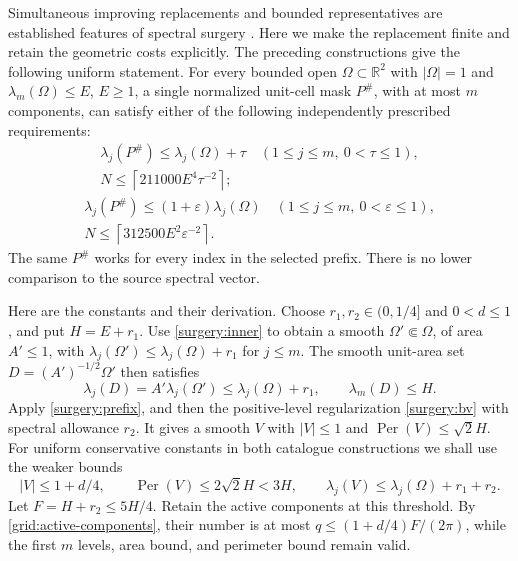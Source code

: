 \documentclass[11pt,reqno]{amsart}
\numberwithin{equation}{section}
\newcommand{\R}{\mathbb R}
\newcommand{\abs}[1]{\lvert#1\rvert}
\newcommand{\Om}{\Omega}
\begin{document}
Simultaneous improving replacements and bounded representatives
are established features of spectral surgery
\cite{MazzoleniPratelli2013,BucurMazzoleni2015}.  Here we make the
replacement finite and retain the geometric costs explicitly.
The preceding constructions give the following uniform statement.
For every bounded open \(\Om\subset\R^2\) with
\(\abs\Om=1\) and \(\lambda_m(\Om)\le E\), \(E\ge1\), a single
normalized unit-cell mask \(P^\#\), with at most \(m\) components,
can satisfy either of the following independently prescribed
requirements:
\begin{equation}
 \begin{gathered}
  \lambda_j(P^\#)\le\lambda_j(\Om)+\tau
       \quad(1\le j\le m,\ 0<\tau\le1),\\
  N\le\left\lceil211000E^4\tau^{-2}\right\rceil;
 \end{gathered}
 \label{grid:additive}
\end{equation}
\begin{equation}
 \begin{gathered}
  \lambda_j(P^\#)\le(1+\varepsilon)\lambda_j(\Om)
       \quad(1\le j\le m,\ 0<\varepsilon\le1),\\
  N\le\left\lceil312500E^2\varepsilon^{-2}\right\rceil.
 \end{gathered}
 \label{grid:relative}
\end{equation}
The same \(P^\#\) works for every index in the selected prefix.
There is no lower comparison to the source spectral vector.

Here are the constants and their derivation.  Choose
\(r_1,r_2\in(0,1/4]\) and \(0<d\le1\), and put \(H=E+r_1\).
Use \eqref{surgery:inner} to obtain a smooth
\(\Om'\Subset\Om\), of area \(A'\le1\), with
\(\lambda_j(\Om')\le\lambda_j(\Om)+r_1\) for \(j\le m\).
The smooth unit-area set \(D=(A')^{-1/2}\Om'\) then satisfies
\[
 \lambda_j(D)=A'\lambda_j(\Om')
 \le\lambda_j(\Om)+r_1,\qquad \lambda_m(D)\le H.
\]
Apply \eqref{surgery:prefix}, and then the positive-level
regularization \eqref{surgery:bv} with spectral allowance \(r_2\).
It gives a smooth \(V\) with \(\abs V\le1\) and
\(\operatorname{Per}(V)\le\sqrt2H\).  For uniform conservative
constants in both catalogue constructions we shall use the weaker
bounds
\[
 \abs V\le1+d/4,\qquad \operatorname{Per}(V)\le2\sqrt2H<3H,
 \qquad \lambda_j(V)\le\lambda_j(\Om)+r_1+r_2.
\]
Let \(F=H+r_2\le5H/4\).  Retain the active components at this
threshold.  By \eqref{grid:active-components}, their number is at
most \(q\le(1+d/4)F/(2\pi)\), while the first \(m\) levels,
area bound, and perimeter bound remain valid.
\end{document}
